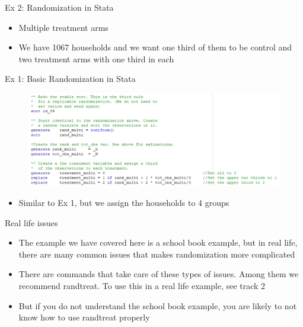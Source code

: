 \documentclass[aspectratio=169]{beamer}
\begin{document}
\begin{frame}{Ex 2: Randomization in Stata}
\begin{itemize}
	\item Multiple treatment arms
	\item We have 1067 households and we want one third of them to be control and two treatment arms with one third in each
\end{itemize}
\end{frame}

\begin{frame}{Ex 1: Basic Randomization in Stata}
\begin{figure}
	\centering
	\includegraphics[width=\linewidth]{img/randomisation_stata_3}
\end{figure}
\begin{itemize}
	\item Similar to Ex 1, but we assign the households to 4 groups
\end{itemize}
\end{frame}

\begin{frame}{Real life issues}
\begin{itemize}
	\item The example we have covered here is a school book example, but in real life, there are many common issues that makes randomization more complicated 
	\item There are commands that take care of these types of issues. Among them we recommend randtreat. To use this in a real life example, see track 2
	\item But if you do not understand the school book example, you are likely to not know how to use randtreat properly
\end{itemize}
\end{frame}
\end{document}
